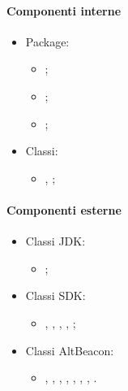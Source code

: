 \documentclass[../Funzionalita.tex]{subfiles}
\begin{document}
			\paragraph*{Componenti interne}
			\begin{itemize}
			
				\item Package:
				\begin{itemize}
					\item \model;
					\item \beacon;
					\item \dataaccess;
				\end{itemize}
				
				\item Classi:
				\begin{itemize}
					\item \BeaconManagerAdapter, \MyBeacon;
				\end{itemize}
												
			\end{itemize}
			
			\paragraph*{Componenti esterne}
			\begin{itemize}
			
				\item Classi JDK:
				\begin{itemize}
					\item[] \PriorityQueue;
				\end{itemize}
				
				\item Classi SDK:
				\begin{itemize}
					\item[] \Intent, \LocalBroadcastManager, \Service, \Binder, \LocalBroadcastManager;
				\end{itemize}
				
				\item Classi AltBeacon:
				\begin{itemize}
					\item[] \BeaconManager, \BootstrapNotifier, \BeaconConsumer, \RangeNotifier, \Region, \BeaconParser, \DistanceCalculator, \Beacon.
				\end{itemize}
				
				
				
			\end{itemize}
			
\end{document}
